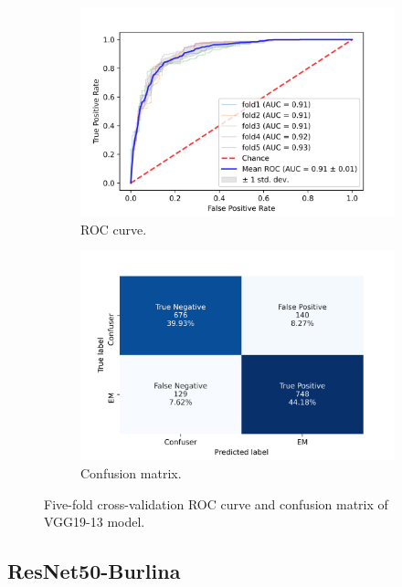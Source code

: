 \begin{figure}[h!]
	\centering
	\begin{subfigure}[b]{0.49\textwidth}
		\centering
		\includegraphics[width=\textwidth,keepaspectratio]{images/Supplement4/image8.png}
		\caption{ROC curve.}
	\end{subfigure}
	\hfill
	\begin{subfigure}[b]{0.49\textwidth}
		\centering
		\includegraphics[width=\textwidth,keepaspectratio]{images/Supplement4/image13.png}
		\caption{Confusion matrix.}
	\end{subfigure}
	\caption{Five-fold cross-validation ROC curve and confusion matrix of VGG19-13 model.}
\end{figure}

\vfill\clearpage
\subsection{ResNet50-Burlina}

